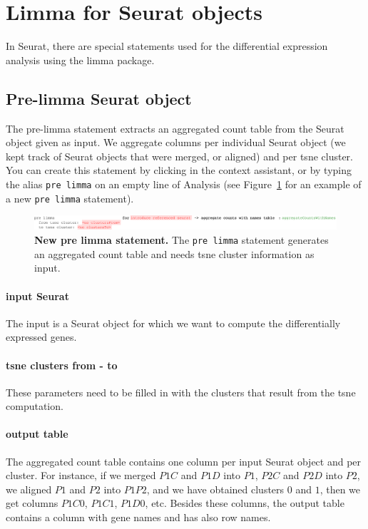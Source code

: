 \section{Limma for Seurat objects}\label{sec:LimmaSeurat}
In Seurat, there are special statements used for the differential expression analysis
using the limma package.

\subsection{Pre-limma Seurat object}
The pre-limma statement extracts an aggregated count table from the Seurat object given as input.
We aggregate columns per individual Seurat object (we kept track of Seurat objects that were merged, or aligned)
and per tsne cluster. You can create this statement by clicking
 in the context assistant, or by typing
the alias \texttt{pre limma} on an empty line of Analysis (see Figure~\ref{fig:PreLimmaSeurat}
for an example of a new \texttt{pre limma} statement).

\begin{figure}[h!tbp]
  \centering
    \includegraphics[width=\figWidthWide]{figures/PreLimmaSeurat.pdf}
    \caption[New pre limma statement.]{\textbf{New pre limma statement.} The \texttt{pre
    limma} statement generates an aggregated count table and needs tsne cluster information
    as input.}
\label{fig:PreLimmaSeurat}
\end{figure}

\paragraph{input Seurat} The input is a Seurat object for which we want to compute the
differentially expressed genes.

\paragraph{tsne clusters from - to} These parameters need to be filled in with the clusters
that result from the tsne computation.

\paragraph{output table} The aggregated count table contains one column per input Seurat
object and per cluster. For instance, if we merged $\mathit{P1C}$ and
$\mathit{P1D}$ into $\mathit{P1}$, $\mathit{P2C}$ and $\mathit{P2D}$ into $\mathit{P2}$, we aligned
$\mathit{P1}$ and $\mathit{P2}$ into $\mathit{P1P2}$, and we have obtained clusters
$\mathit{0}$ and $\mathit{1}$, then we get columns $\mathit{P1C0}$, $\mathit{P1C1}$, $\mathit{P1D0}$, etc.
Besides these columns, the output table contains a column with gene names and has also row names.

